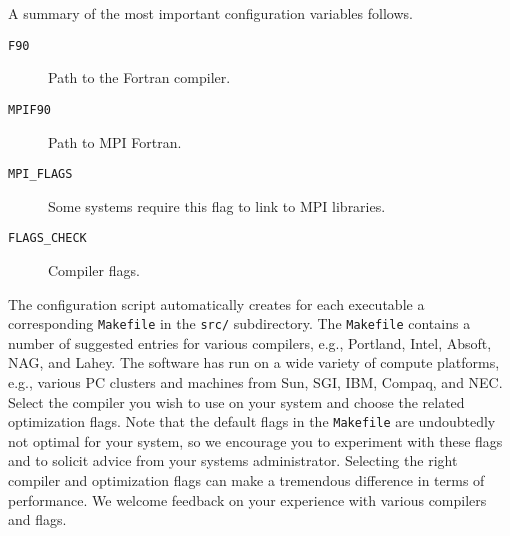 \noindent
A summary of the most important configuration variables follows.
\begin{description}
\item [{\texttt{F90}}] Path to the Fortran compiler.

\item [{\texttt{MPIF90}}] Path to MPI Fortran.

\item [{\texttt{MPI\_FLAGS}}] Some systems require this flag to link to
MPI libraries.

\item [{\texttt{FLAGS\_CHECK}}] Compiler flags.
\end{description}
%
The configuration script automatically creates for each executable
a corresponding \texttt{Makefile} in the \texttt{src/} subdirectory.
The \texttt{Makefile} contains a number of suggested entries for various
compilers, e.g., Portland, Intel, Absoft, NAG, and Lahey. The software
has run on a wide variety of compute platforms, e.g., various PC clusters
and machines from Sun, SGI, IBM, Compaq, and NEC. Select the compiler
you wish to use on your system and choose the related optimization
flags. Note that the default flags in the \texttt{Makefile} are undoubtedly
not optimal for your system, so we encourage you to experiment with
these flags and to solicit advice from your systems administrator.
Selecting the right compiler and optimization flags can make a tremendous
difference in terms of performance. We welcome feedback on your experience
with various compilers and flags.\\

